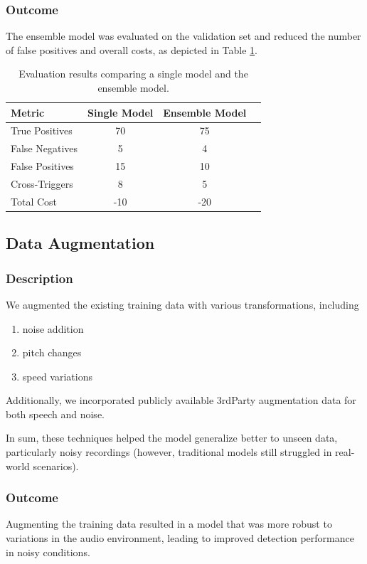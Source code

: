 \subsubsection{Outcome}
The ensemble model was evaluated on the validation set and reduced the number of false positives and overall costs, as depicted in Table \ref{tab:ensemble_results}.

\begin{table}[h]
\centering
\begin{tabular}{lccc}
\toprule
Metric & Single Model & Ensemble Model \\
\midrule
True Positives & 70 & 75 \\
False Negatives & 5 & 4 \\
False Positives & 15 & 10 \\
Cross-Triggers & 8 & 5 \\
Total Cost & -10 & -20 \\
\bottomrule
\end{tabular}
\caption{Evaluation results comparing a single model and the ensemble model.}
\label{tab:ensemble_results}
\end{table}

\subsection{Data Augmentation}
\subsubsection{Description}
We augmented the existing training data with various transformations, including

\begin{enumerate}
\item noise addition
\item pitch changes
\item speed variations
\end{enumerate}

Additionally, we incorporated publicly available 3rdParty augmentation data for both speech and noise.

In sum, these techniques helped the model generalize better to unseen data, particularly noisy recordings
(however, traditional models still struggled in real-world scenarios).

\subsubsection{Outcome}
Augmenting the training data resulted in a model that was more robust to variations in the audio environment,
leading to improved detection performance in noisy conditions.

